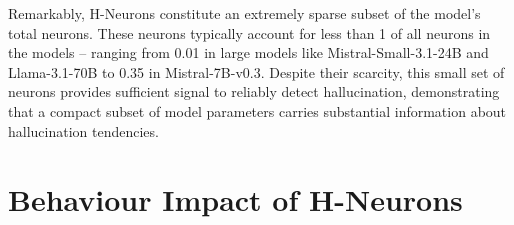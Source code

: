 \documentclass[dvipsnames]{article}
\begin{document}
Remarkably, H-Neurons constitute an extremely sparse subset of the model's total neurons. These neurons typically account for less than 1\textperthousand{} of all neurons in the models -- ranging from 0.01\textperthousand{} in large models like Mistral-Small-3.1-24B and Llama-3.1-70B to 0.35\textperthousand{} in Mistral-7B-v0.3. Despite their scarcity, this small set of neurons provides sufficient signal to reliably detect hallucination, demonstrating that a compact subset of model parameters carries substantial information about hallucination tendencies.






\section{Behaviour Impact of H-Neurons}
\label{FunctionalImpact}
\end{document}
